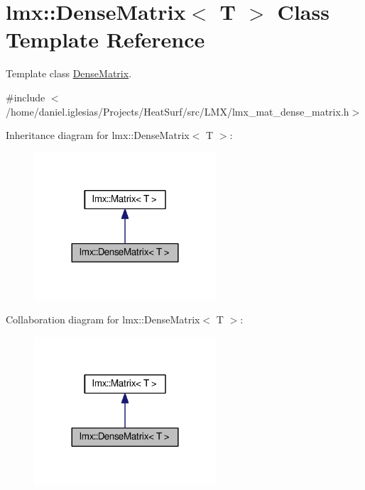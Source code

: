 \hypertarget{classlmx_1_1DenseMatrix}{\section{lmx\-:\-:Dense\-Matrix$<$ T $>$ Class Template Reference}
\label{classlmx_1_1DenseMatrix}
}


Template class \hyperlink{classlmx_1_1DenseMatrix}{Dense\-Matrix}.  




{\ttfamily \#include $<$/home/daniel.\-iglesias/\-Projects/\-Heat\-Surf/src/\-L\-M\-X/lmx\-\_\-mat\-\_\-dense\-\_\-matrix.\-h$>$}



Inheritance diagram for lmx\-:\-:Dense\-Matrix$<$ T $>$\-:
\nopagebreak
\begin{figure}[H]
\begin{center}
\leavevmode
\includegraphics[width=192pt]{classlmx_1_1DenseMatrix__inherit__graph}
\end{center}
\end{figure}


Collaboration diagram for lmx\-:\-:Dense\-Matrix$<$ T $>$\-:
\nopagebreak
\begin{figure}[H]
\begin{center}
\leavevmode
\includegraphics[width=192pt]{classlmx_1_1DenseMatrix__coll__graph}
\end{center}
\end{figure}
